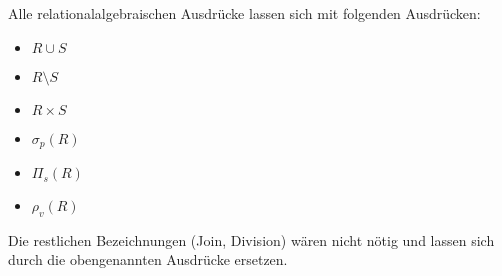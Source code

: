 Alle relationalalgebraischen Ausdrücke lassen sich mit folgenden Ausdrücken:

\begin{itemize}
	\item $R \cup S$
	\item $R \setminus S$
	\item $R \times S$
	\item $\sigma_p(R)$
	\item $\Pi_s(R)$
	\item $\rho_v(R)$
\end{itemize}

Die restlichen Bezeichnungen (Join, Division) wären nicht nötig und lassen sich durch die obengenannten Ausdrücke ersetzen.